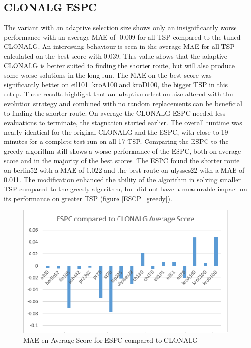 \subsection{CLONALG ESPC}
The variant with an adaptive selection size shows only an insignificantly worse performance with an average MAE of -0.009 for all TSP compared to the tuned CLONALG. An interesting behaviour is seen in the average MAE for all TSP calculated on the best score with 0.039. This value shows that the adaptive CLONALG is better suited to finding the shorter route, but will also produce some worse solutions in the long run. The MAE on the best score was significantly better on eil101, kroA100 and kroD100, the bigger TSP in this setup. These results highlight that an adaptive selection size altered with the evolution strategy and combined with no random replacements can be beneficial to finding the shorter route. On average the CLONALG ESPC needed less evaluations to terminate, the stagnation started earlier. The overall runtime was nearly identical for the original CLONALG and the ESPC, with close to 19 minutes for a complete test run on all 17 TSP. Comparing the ESPC to the greedy algorithm still shows a worse performance of the ESPC, both on average score and in the majority of the best scores. The ESPC found the shorter route on berlin52 with a MAE of 0.022 and the best route on ulysses22 with a MAE of 0.011. The modification enhanced the ability of the algorithm in solving smaller TSP compared to the greedy algorithm, but did not have a measurable impact on its performance on greater TSP (figure \ref{ESCP_greedy}).\\
\begin{figure}[h]
\includegraphics[]{Images/ESPC_Fig_Avg.png}
\caption{MAE on Average Score for ESPC compared to CLONALG}
\label{ESCP_AVG}
\end{figure}
